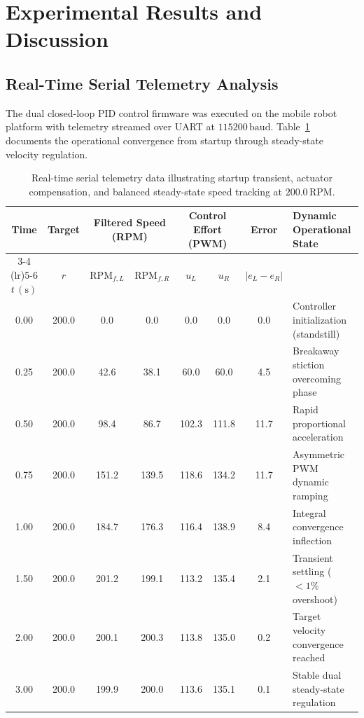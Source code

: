 \documentclass[11pt,a4paper]{article}
\begin{document}
\newpage
\section{Experimental Results and Discussion}

\subsection{Real-Time Serial Telemetry Analysis}
The dual closed-loop PID control firmware was executed on the mobile robot platform with telemetry streamed over UART at $115200\,\text{baud}$. Table~\ref{tab_telemetry} documents the operational convergence from startup through steady-state velocity regulation.

\vspace{0.05cm}
\begin{table}[H]
\centering
\scriptsize
\renewcommand{\arraystretch}{0.70}
\begin{tabularx}{\textwidth}{@{}cccccccX@{}}
\toprule
\textbf{Time} & \textbf{Target} & \multicolumn{2}{c}{\textbf{Filtered Speed (RPM)}} & \multicolumn{2}{c}{\textbf{Control Effort (PWM)}} & \textbf{Error} & \textbf{Dynamic Operational State} \\
\cmidrule(lr){3-4} \cmidrule(lr){5-6}
$t\,(\text{s})$ & $r$ & $\text{RPM}_{f,L}$ & $\text{RPM}_{f,R}$ & $u_L$ & $u_R$ & $|e_L - e_R|$ & \\
\midrule
0.00 & 200.0 & 0.0 & 0.0 & 0.0 & 0.0 & 0.0 & Controller initialization (standstill) \\
0.25 & 200.0 & 42.6 & 38.1 & 60.0 & 60.0 & 4.5 & Breakaway stiction overcoming phase \\
0.50 & 200.0 & 98.4 & 86.7 & 102.3 & 111.8 & 11.7 & Rapid proportional acceleration \\
0.75 & 200.0 & 151.2 & 139.5 & 118.6 & 134.2 & 11.7 & Asymmetric PWM dynamic ramping \\
1.00 & 200.0 & 184.7 & 176.3 & 116.4 & 138.9 & 8.4 & Integral convergence inflection \\
1.50 & 200.0 & 201.2 & 199.1 & 113.2 & 135.4 & 2.1 & Transient settling ($<1\%$ overshoot) \\
2.00 & 200.0 & 200.1 & 200.3 & 113.8 & 135.0 & 0.2 & Target velocity convergence reached \\
3.00 & 200.0 & 199.9 & 200.0 & 113.6 & 135.1 & 0.1 & Stable dual steady-state regulation \\
\bottomrule
\end{tabularx}
\caption{Real-time serial telemetry data illustrating startup transient, actuator compensation, and balanced steady-state speed tracking at $200.0\,\text{RPM}$.}
\label{tab_telemetry}
\end{table}
\end{document}
